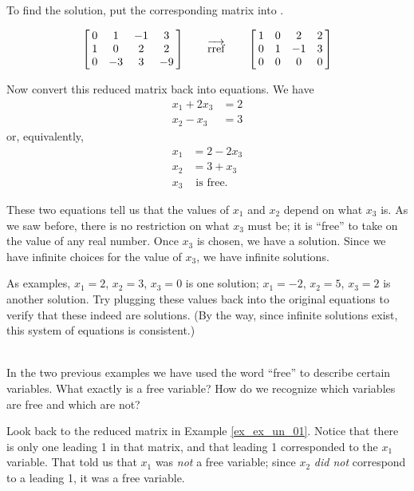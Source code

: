 {To find the solution, put the corresponding matrix into \rref.

$$\bmx{cccc} 0&1&-1&3\\ 1&0&2&2\\ 0&-3&3&-9\emx \qquad \overrightarrow{\text{rref}} \qquad \bmx{cccc}1&0&2&2\\ 0&1&-1&3\\ 0&0&0&0 \emx$$

Now convert this reduced matrix back into equations. We have 
\begin{align*} x_1 + 2x_3 &= 2 \\ x_2-x_3&=3 \end{align*} 
or, equivalently, 
\begin{align*} x_1 &= 2-2x_3 \\ x_2&=3+x_3\\x_3&\text{ is free.} \end{align*}

These two equations tell us that the values of $x_1$ and $x_2$ depend on what $x_3 $ is. As we saw before, there is no restriction on what $x_3$ must be; it is ``free'' to take on the value of any real number. Once $x_3$ is chosen, we have a solution. Since we have infinite choices for the value of $x_3$, we have infinite solutions. 

As examples, $x_1 = 2$, $x_2 = 3$, $x_3 = 0$ is one solution; $x_1 = -2$, $x_2 = 5$, $x_3 = 2$ is another solution. Try plugging these values back into the original equations to verify that these indeed are solutions. (By the way, since infinite solutions exist, this system of equations is consistent.)}\\ 


In the two previous examples we have used the word ``free'' to describe certain variables. What exactly is a free variable? How do we recognize which variables are free and which are not? 

Look back to the reduced matrix in Example \ref{ex_ex_un_01}. Notice that there is only one leading 1 in that matrix, and that leading 1 corresponded to the $x_1$ variable. That told us that $x_1$ was \textit{not} a free variable; since $x_2$ \textit{did not} correspond to a leading 1, it was a free variable.

